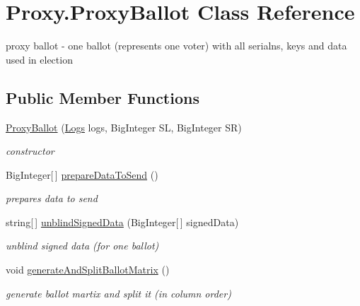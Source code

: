 \hypertarget{class_proxy_1_1_proxy_ballot}{}\section{Proxy.\+Proxy\+Ballot Class Reference}
\label{class_proxy_1_1_proxy_ballot}


proxy ballot -\/ one ballot (represents one voter) with all serialns, keys and data used in election  


\subsection*{Public Member Functions}
\begin{DoxyCompactItemize}
\item 
\hyperlink{class_proxy_1_1_proxy_ballot_a42081ea06bb9cb5c0e665cfb19611d53}{Proxy\+Ballot} (\hyperlink{class_proxy_1_1_logs}{Logs} logs, Big\+Integer S\+L, Big\+Integer S\+R)
\begin{DoxyCompactList}\small\item\em constructor \end{DoxyCompactList}\item 
Big\+Integer\mbox{[}$\,$\mbox{]} \hyperlink{class_proxy_1_1_proxy_ballot_a3b7dede08c6d7b670b4fa5d5a9baf8a4}{prepare\+Data\+To\+Send} ()
\begin{DoxyCompactList}\small\item\em prepares data to send \end{DoxyCompactList}\item 
string\mbox{[}$\,$\mbox{]} \hyperlink{class_proxy_1_1_proxy_ballot_af595adcd28b0248f75aa80c897919dd5}{unblind\+Signed\+Data} (Big\+Integer\mbox{[}$\,$\mbox{]} signed\+Data)
\begin{DoxyCompactList}\small\item\em unblind signed data (for one ballot) \end{DoxyCompactList}\item 
void \hyperlink{class_proxy_1_1_proxy_ballot_aae56f2cd8edf07ef42fc750ac380f84f}{generate\+And\+Split\+Ballot\+Matrix} ()
\begin{DoxyCompactList}\small\item\em generate ballot martix and split it (in column order) \end{DoxyCompactList}\end{DoxyCompactItemize}
